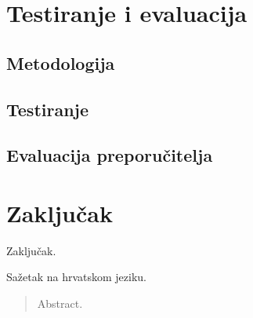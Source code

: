 \documentclass[times, utf8, diplomski]{fer}
\begin{document}
\chapter{Testiranje i evaluacija}
\section{Metodologija}
\section{Testiranje}
\section{Evaluacija preporučitelja}

\chapter{Zaključak}
Zaključak.




\begin{sazetak}
Sažetak na hrvatskom jeziku.

\end{sazetak}

\begin{abstract}
Abstract.

\end{abstract}
\end{document}
